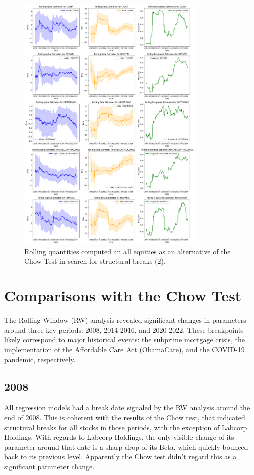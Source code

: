 \begin{figure}[h]
    \centering
    \includegraphics[width=0.8\textwidth]{images/rolling_quantities_2.png}
    \caption{Rolling quantities computed an all equities as an alternative of the Chow Test in search for structural
    breaks (2).}\label{fig:rolling_quantities_2}
\end{figure}

\section{Comparisons with the Chow Test}

The Rolling Window (RW) analysis revealed significant changes in parameters around three key periods: 2008, 2014-2016, and 
2020-2022. These breakpoints likely correspond to major historical events: the subprime mortgage crisis, the implementation of 
the Affordable Care Act (ObamaCare), and the COVID-19 pandemic, respectively.

\subsection{2008}

All regression models had a break date signaled by the RW analysis around the end of 
2008. This is coherent with the results of the Chow test, that indicated structural breaks 
for all stocks in those periods, with the exception of Labcorp Holdings. 
With regards to Labcorp Holdings, the only visible change of its parameter around that 
date is a sharp drop of its Beta, which quickly bounced back to its previous level.  
Apparently the Chow test didn't regard this as a significant parameter change.

